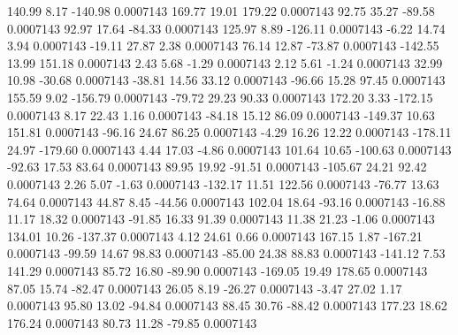       140.99        8.17     -140.98     0.0007143
      169.77       19.01      179.22     0.0007143
       92.75       35.27      -89.58     0.0007143
       92.97       17.64      -84.33     0.0007143
      125.97        8.89     -126.11     0.0007143
       -6.22       14.74        3.94     0.0007143
      -19.11       27.87        2.38     0.0007143
       76.14       12.87      -73.87     0.0007143
     -142.55       13.99      151.18     0.0007143
        2.43        5.68       -1.29     0.0007143
        2.12        5.61       -1.24     0.0007143
       32.99       10.98      -30.68     0.0007143
      -38.81       14.56       33.12     0.0007143
      -96.66       15.28       97.45     0.0007143
      155.59        9.02     -156.79     0.0007143
      -79.72       29.23       90.33     0.0007143
      172.20        3.33     -172.15     0.0007143
        8.17       22.43        1.16     0.0007143
      -84.18       15.12       86.09     0.0007143
     -149.37       10.63      151.81     0.0007143
      -96.16       24.67       86.25     0.0007143
       -4.29       16.26       12.22     0.0007143
     -178.11       24.97     -179.60     0.0007143
        4.44       17.03       -4.86     0.0007143
      101.64       10.65     -100.63     0.0007143
      -92.63       17.53       83.64     0.0007143
       89.95       19.92      -91.51     0.0007143
     -105.67       24.21       92.42     0.0007143
        2.26        5.07       -1.63     0.0007143
     -132.17       11.51      122.56     0.0007143
      -76.77       13.63       74.64     0.0007143
       44.87        8.45      -44.56     0.0007143
      102.04       18.64      -93.16     0.0007143
      -16.88       11.17       18.32     0.0007143
      -91.85       16.33       91.39     0.0007143
       11.38       21.23       -1.06     0.0007143
      134.01       10.26     -137.37     0.0007143
        4.12       24.61        0.66     0.0007143
      167.15        1.87     -167.21     0.0007143
      -99.59       14.67       98.83     0.0007143
      -85.00       24.38       88.83     0.0007143
     -141.12        7.53      141.29     0.0007143
       85.72       16.80      -89.90     0.0007143
     -169.05       19.49      178.65     0.0007143
       87.05       15.74      -82.47     0.0007143
       26.05        8.19      -26.27     0.0007143
       -3.47       27.02        1.17     0.0007143
       95.80       13.02      -94.84     0.0007143
       88.45       30.76      -88.42     0.0007143
      177.23       18.62      176.24     0.0007143
       80.73       11.28      -79.85     0.0007143
